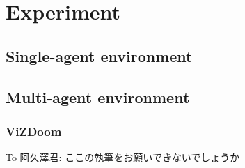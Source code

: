 \section{Experiment}
\subsection{Single-agent environment}
\subsection{Multi-agent environment}
\subsubsection{ViZDoom}
To 阿久澤君: ここの執筆をお願いできないでしょうか

\iffalse
・交通ネットワーク - 大澤
・Atari - 田村
・VisDoom - 阿久澤

可能であれば
・ニューロエボリューション

乗せる図
・精度（Learning Curve）
・価値の評価をレイヤーごとに表示
\fi
